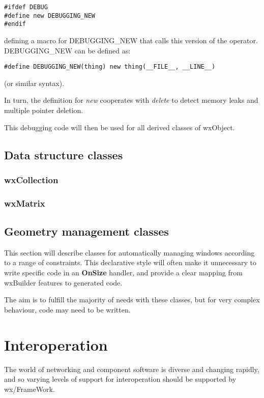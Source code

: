 \begin{verbatim}
#ifdef DEBUG
#define new DEBUGGING_NEW
#endif
\end{verbatim}

defining a macro for DEBUGGING\_NEW that calls this version of the operator.
DEBUGGING\_NEW can be defined as:

\begin{verbatim}
#define DEBUGGING_NEW(thing) new thing(__FILE__, __LINE__)
\end{verbatim}

(or similar syntax).

In turn, the definition for {\it new} cooperates with {\it delete} to detect
memory leaks and multiple pointer deletion.

This debugging code will then be used for all derived classes of wxObject.

\section{Data structure classes}

\subsection{wxCollection}

\subsection{wxMatrix}

\section{Geometry management classes}

This section will describe classes for automatically managing windows
according to a range of constraints. This declarative style will often
make it unnecessary to write specific code in an {\bf OnSize} handler,
and provide a clear mapping from wxBuilder features to generated code.

The aim is to fulfill the majority of needs with these classes, but for
very complex behaviour, code may need to be written.

\chapter{Interoperation}

The world of networking and component software is diverse and changing rapidly, and
so varying levels of support for interoperation should be supported by
wx/FrameWork.

